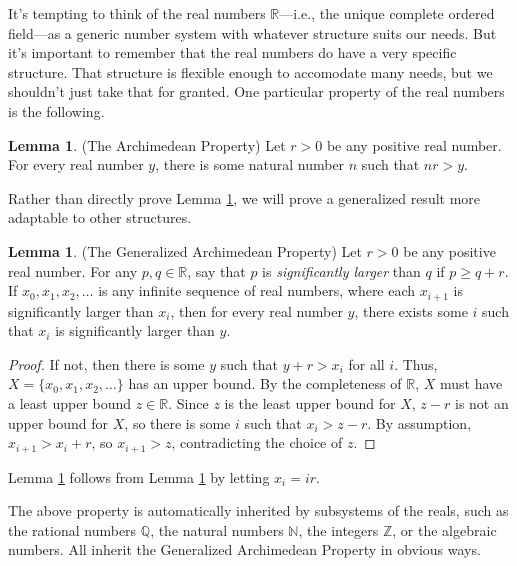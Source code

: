 \documentclass[reqno]{article}
\theoremstyle{definition}
\newtheorem{lemma}[theorem]{Lemma}
\begin{document}
It's tempting to think of the real numbers $\mathbb R$---i.e., the unique
complete ordered field---as a generic number system with whatever
structure suits our needs. But it's important to remember that the
real numbers do have a very specific structure. That structure is
flexible enough to accomodate many needs, but we shouldn't just
take that for granted. One particular property of the real numbers
is the following.

\begin{lemma}
\label{specializedarchimedeanlemma}
(The Archimedean Property)
Let $r>0$ be any positive real number.
For every real number $y$, there is some natural number $n$
such that $nr>y$.
\end{lemma}

Rather than directly prove Lemma \ref{specializedarchimedeanlemma},
we will prove a generalized result more adaptable
to other structures.

\begin{lemma}
\label{generalizedarchimedeanlemma}
(The Generalized Archimedean Property)
Let $r>0$ be any positive real number.
For any $p,q\in\mathbb R$, say that $p$ is \emph{significantly larger}
than $q$ if $p\geq q+r$.
If $x_0,x_1,x_2,\ldots$ is any infinite sequence of real numbers,
where each $x_{i+1}$ is significantly larger than $x_i$, then for every real number $y$,
there exists some $i$ such that $x_i$ is significantly larger than $y$.
\end{lemma}

\begin{proof}
If not, then there is some $y$ such that $y+r > x_i$ for all $i$.
Thus, $X=\{x_0,x_1,x_2,\ldots\}$ has an upper bound. By the completeness
of $\mathbb R$, $X$ must have a least upper bound $z\in\mathbb R$.
Since $z$ is the least upper bound for $X$, $z-r$ is not an upper bound
for $X$, so there is some $i$ such that $x_i>z-r$.
By assumption, $x_{i+1}>x_i+r$, so $x_{i+1}>z$, contradicting the choice
of $z$.
\end{proof}

Lemma \ref{specializedarchimedeanlemma} follows from
Lemma \ref{generalizedarchimedeanlemma} by letting $x_i=ir$.

The above property is automatically inherited by subsystems
of the reals, such as the rational numbers $\mathbb Q$, the natural
numbers $\mathbb N$, the integers $\mathbb Z$, or the algebraic numbers.
All inherit the Generalized Archimedean Property in obvious ways.
\end{document}
